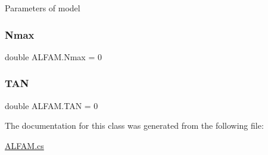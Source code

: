 Parameters of model 

\mbox{\label{class_a_l_f_a_m_a6f6fecb398e1e18a76b684aa7a09385c}} 
\subsubsection{\texorpdfstring{Nmax}{Nmax}}
{\footnotesize\ttfamily double A\+L\+F\+A\+M.\+Nmax = 0}

\mbox{\label{class_a_l_f_a_m_a2d2c07644fb7d996f28d46a77133b996}} 
\subsubsection{\texorpdfstring{TAN}{TAN}}
{\footnotesize\ttfamily double A\+L\+F\+A\+M.\+T\+AN = 0}



The documentation for this class was generated from the following file\+:\begin{DoxyCompactItemize}
\item 
\mbox{\hyperlink{_a_l_f_a_m_8cs}{A\+L\+F\+A\+M.\+cs}}\end{DoxyCompactItemize}
